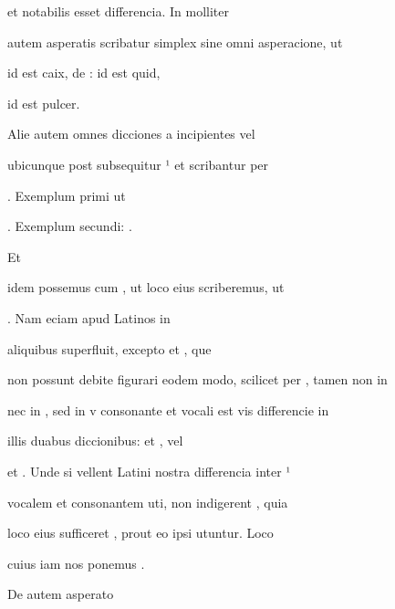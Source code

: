  et  notabilis esset differencia. In molliter

autem asperatis scribatur simplex  sine omni asperacione, ut

   id est caix, de :  id est quid, 

\splitlines

id est pulcer.

\indentK Alie autem omnes dicciones a  incipientes vel

\fulllines

ubicunque post  subsequitur   ¹ et  scribantur per

. Exemplum primi ut     

\splitlines

. Exemplum secundi:    .

\indentK Et

\fulllines

idem possemus cum , ut loco eius  scriberemus, ut 

  . Nam eciam apud Latinos  in

 aliquibus superfluit, excepto  et , que 

non possunt debite figurari eodem modo, scilicet per , tamen non in 

nec in , sed in v consonante et vocali est vis differencie in

illis duabus diccionibus:  et , vel 

et . Unde si vellent Latini nostra differencia inter ¹

vocalem et  consonantem uti, non indigerent , quia

loco eius sufficeret , prout eo ipsi utuntur. Loco

\splitlines

cuius iam nos ponemus .

\indentK De  autem asperato

